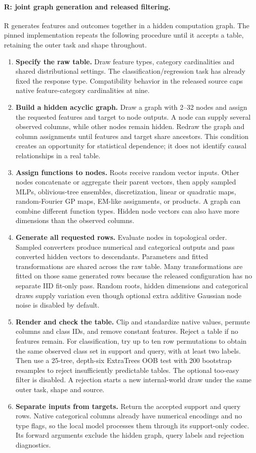 \documentclass[11pt]{article}
\begin{document}
\paragraph{R: joint graph generation and released filtering.}
R generates features and outcomes together in a hidden computation graph. The pinned implementation repeats the following procedure until it accepts a table, retaining the outer task and shape throughout.
\begin{enumerate}
\item \textbf{Specify the raw table.} Draw feature types, category cardinalities and shared distributional settings. The classification/regression task has already fixed the response type. Compatibility behavior in the released source caps native feature-category cardinalities at nine.
\item \textbf{Build a hidden acyclic graph.} Draw a graph with 2--32 nodes and assign the requested features and target to node outputs. A node can supply several observed columns, while other nodes remain hidden. Redraw the graph and column assignments until features and target share ancestors. This condition creates an opportunity for statistical dependence; it does not identify causal relationships in a real table.
\item \textbf{Assign functions to nodes.} Roots receive random vector inputs. Other nodes concatenate or aggregate their parent vectors, then apply sampled MLPs, oblivious-tree ensembles, discretization, linear or quadratic maps, random-Fourier GP maps, EM-like assignments, or products. A graph can combine different function types. Hidden node vectors can also have more dimensions than the observed columns.
\item \textbf{Generate all requested rows.} Evaluate nodes in topological order. Sampled converters produce numerical and categorical outputs and pass converted hidden vectors to descendants. Parameters and fitted transformations are shared across the raw table. Many transformations are fitted on those same generated rows because the released configuration has no separate IID fit-only pass. Random roots, hidden dimensions and categorical draws supply variation even though optional extra additive Gaussian node noise is disabled by default.
\item \textbf{Render and check the table.} Clip and standardize native values, permute columns and class IDs, and remove constant features. Reject a table if no features remain. For classification, try up to ten row permutations to obtain the same observed class set in support and query, with at least two labels. Then use a 25-tree, depth-six ExtraTrees OOB test with 200 bootstrap resamples to reject insufficiently predictable tables. The optional too-easy filter is disabled. A rejection starts a new internal-world draw under the same outer task, shape and source.
\item \textbf{Separate inputs from targets.} Return the accepted support and query rows. Native categorical columns already have numerical encodings and no type flags, so the local model processes them through its support-only codec. Its forward arguments exclude the hidden graph, query labels and rejection diagnostics.
\end{enumerate}
\end{document}
